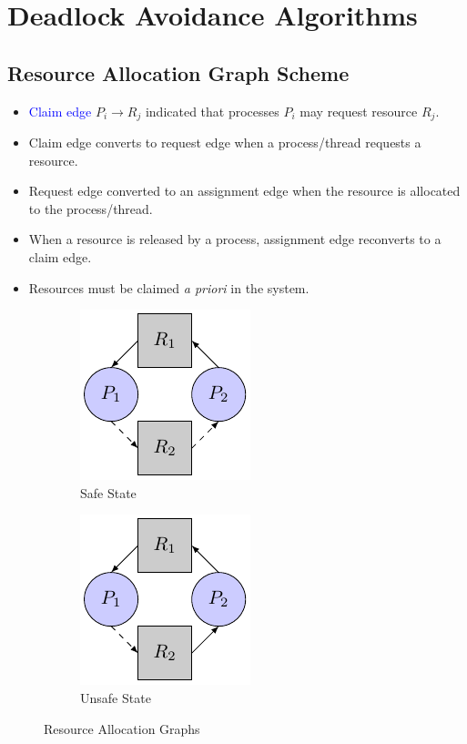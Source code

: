 \documentclass[oneside]{book}
\begin{document}
        \section{Deadlock Avoidance Algorithms}
            \subsection{Resource Allocation Graph Scheme}
                \begin{itemize}
                    \item \textcolor{blue}{Claim edge} $P_i \rightarrow R_j$ indicated that processes $P_i$ may request resource
                    $R_j$.
                    \item Claim edge converts to request edge when a process/thread requests a resource.
                    \item Request edge converted to an assignment edge when the resource is allocated to the process/thread.
                    \item When a resource is released by a process, assignment edge reconverts to a claim edge.
                    \item Resources must be claimed \textit{a priori} in the system.
                \end{itemize}
                \begin{figure}[H]
                    \centering
                    \begin{subfigure}{0.5\linewidth}
                        \centering
                        \includegraphics{figures/resource_allocation_safe.pdf}
                        \caption{Safe State}
                    \end{subfigure}%
                    \begin{subfigure}{0.5\linewidth}
                        \centering
                        \includegraphics{figures/resource_allocation_unsafe.pdf}
                        \caption{Unsafe State}
                    \end{subfigure}
                    \caption{Resource Allocation Graphs}
                \end{figure}
\end{document}
